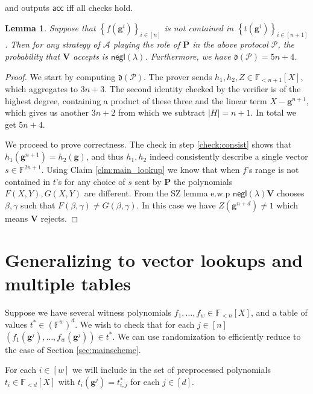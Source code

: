 \documentclass[11pt]{article} %
\newcommand{\F}{\ensuremath{\mathbb F}\xspace}
\newcommand{\adv}{\ensuremath{\mathcal A}\xspace}
\newcommand{\negl}{\ensuremath{\mathsf{negl}(\lambda)}\xspace}
\newcommand{\acc}{\ensuremath{\mathsf{acc}}\xspace}
\newcommand{\sett}[2]{\ensuremath{\set{#1}_{#2}}\xspace}
\newcommand{\prv}{\ensuremath{\mathsf{\mathbf{P}}}\xspace}
\newcommand{\prvpoly}{\ensuremath{\prv}\xspace}
\newcommand{\verpoly}{\ensuremath{\ver}\xspace}%
\newcommand{\ver}{\ensuremath{\mathsf{\mathbf{V}}}\xspace}
\newcommand{\set}[1]{\ensuremath{\left\{#1\right\}}\xspace}
\newcommand{\hgen}{\ensuremath{\mathbf{g}}\xspace}
\newcommand{\polysofdeg}[1]{\ensuremath{\F_{< #1}[X]}\xspace}
\newcommand{\prot}{\ensuremath{\mathscr{P}}\xspace}
\newcommand{\aggdeg}[1]{\ensuremath{\mathfrak{d}(#1)}\xspace}
\newtheorem{lemma}{Lemma}[section]
\newcommand{\sone}{\ensuremath{ h_1}\xspace}
\newcommand{\stwo}{\ensuremath{ h_{2}}\xspace}
\begin{document}
\begin{enumerate}
\begin{enumerate}
 \end{enumerate}

 and outputs \acc iff all checks hold.
\end{enumerate}
\begin{lemma}\label{lem:lookupprot}
 Suppose that $\sett{f(\hgen^i)}{i\in [n]}$ is not contained in  \sett{t(\hgen^i)}{i\in [n+1]}.
 Then for any strategy of \adv playing the role of \prvpoly in the above protocol \prot, the probability that
 \verpoly accepts is \negl.
 Furthermore, we have $\aggdeg{\prot} = 5n+4$.
\end{lemma}
\begin{proof}
We start by computing $\aggdeg{\prot}$.
The prover sends $\sone,\stwo,Z\in \polysofdeg{n+1}$,
which aggregates to $3n+3$. The second identity checked by the verifier is of the highest degree, containing a product of these three and the linear term $X-\hgen^{n+1}$,
which gives us another $3n+2$ from which we subtract $|H|=n+1$.
In total we get $5n+4$.

We proceed to prove correctness. The check in step \ref{check:consist} shows that $\sone(\hgen^{n+1})=\stwo(\hgen)$, and thus $\sone,\stwo$ indeed consistently describe a single vector $s\in \F^{2n+1}$.
Using Claim \ref{clm:main_lookup} we know that when $f$'s range is not contained in $t$'s for any choice of $s$ sent by \prvpoly the polynomials $F(X,Y), G(X,Y)$ are different.
 From the SZ lemma e.w.p \negl \verpoly chooses $\beta,\gamma$ such that $F(\beta,\gamma)\neq G(\beta,\gamma)$. In this case we have $Z(\hgen^{n+d})\neq 1$ which means \verpoly rejects.
\end{proof}

\section{Generalizing to vector lookups and multiple tables}
Suppose we have several witness polynomials $f_1,\ldots,f_w \in \polysofdeg{n}$,
and a table of values $t^*\in (\F^w)^d$. 
We wish to check that for each $j\in [n]$
$(f_1(\hgen^j),\ldots,f_w(\hgen^j))\in t^*$.
We can use randomization to efficiently reduce to the case of Section \ref{sec:mainscheme}.

For each $i\in [w]$ we will include in the set of preprocessed polynomials $t_i \in \polysofdeg{d}$ with $t_i(\hgen^j) = t^*_{i,j}$ for each $j\in [d]$.
\end{document}
